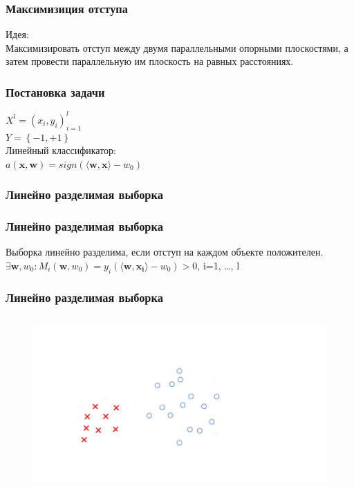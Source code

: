 \documentclass[12pt]{beamer}
\begin{document}
\begin{frame}\frametitle{Максимизиция отступа}
Идея:\\
Максимизировать отступ между двумя параллельными опорными плоскостями, а затем провести параллельную им плоскость на равных расстояниях.\\
\end{frame}

\begin{frame}\frametitle{Постановка задачи}
${X^l = (x_i,y_i)_{i = 1}^l}$\\ 
${Y=\left\{-1,+1\right\}}$\\
\vspace{5mm}
Линейный классификатор:\\
$a(\mathbf{x}, \mathbf{w}) = sign(\langle \mathbf{w}, \mathbf{x}\rangle - w_0)$\\
\end{frame}


\begin{frame}\frametitle{Линейно разделимая выборка}
\end{frame}

\begin{frame}\frametitle{Линейно разделимая выборка}
Выборка линейно разделима, если отступ на каждом объекте положителен.\\
\vspace{5mm}
$\exists \mathbf{w}, w_0 : M_i(\mathbf{w}, w_0) = y_i  (\langle \mathbf{w}, \mathbf{x_i} \rangle - w_0) > 0$, i=1, \dots , l\\
\end{frame}

\begin{frame}\frametitle{Линейно разделимая выборка}
\begin{figure}[htbp]
  \includegraphics[height=190pt, keepaspectratio = true]{images/linearly_separable1}   
\end{figure}
\end{frame}
\end{document}
